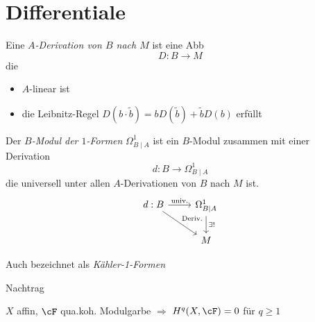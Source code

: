 \section{Differentiale} %

\begin{defn}
Eine \emph{$A$-Derivation von $B$ nach $M$} ist eine Abb
\[
  D:B\rightarrow M
\]
die
\begin{itemize}
\item $A$-linear ist
\item die Leibnitz-Regel $D(b\cdot\tilde b)=bD(\tilde b)+\tilde bD(b)$
erfüllt
\end{itemize}
\end{defn}

\begin{defn}
Der \emph{$B$-Modul der $1$-Formen} $\Omega_{B\mid A}^1$ ist ein $B$-Modul
zusammen mit einer Derivation
\[
  d:B\rightarrow \Omega_{B\mid A}^1
\]
die universell unter allen $A$-Derivationen von $B$ nach $M$ ist.
	\[\begin{tikzcd}
		d:B \rar{\text{univ.}} \arrow{dr}{\text{Deriv.}} & \Omega_{B\mid A}^1 \dar{\exists!} \\
		                                                 & M
	\end{tikzcd}\]
\end{defn}
\begin{bem}
Auch bezeichnet als \emph{Kähler-1-Formen}
\end{bem}

\begin{einschub}{Nachtrag}
\begin{thm}
$X$ affin, $\cF$ qua.koh. Modulgarbe $\Rightarrow$ $H^q(X,\cF)=0$ für $q\geq 1$
\end{thm}
\TODO
\end{einschub}
